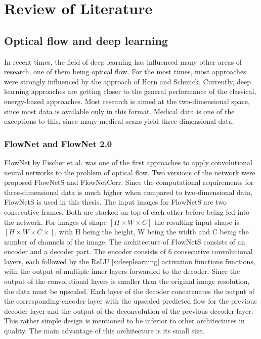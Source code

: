 \chapter{Review of Literature}

\section{Optical flow and deep learning}
In recent times, the field of deep learning has influenced many other areas of research, one of them being optical flow. For the most times, most approaches were strongly influenced by the approach of Horn and Schunck\cite{hornDeterminingOpticalFlow}. 
Currently, deep learning approaches are getting closer to the general performance of the classical, energy-based approaches. 
Most research is aimed at the two-dimensional space, since most data is available only in this format. Medical data is one of the exceptions to this, since many medical scans yield three-dimensional data.
\subsection{FlowNet and FlowNet 2.0}
FlowNet by Fischer et al. \cite{fischerFlowNetLearningOptical2015} was one of the first approaches to apply convolutional neural networks  to the problem of optical flow. 
Two versions of the network were proposed \ac{FlowNetS} and FlowNetCorr. 
Since the computational requirements for three-dimensional data is much higher when compared to two-dimensional data, \acs{FlowNetS} is used in this thesis.
The input images for \acs{FlowNetS} are two consecutive frames. Both are stacked on top of each other before being fed into the network. For images of shape $\left[H\times W \times C\right]$ the resulting input shape is $\left[H \times W \times C \times \right]$, with H being the height, W being the width and C being the number of channels of the image.
The architecture of FlowNetS consists of an encoder and a decoder part.
The encoder consists  of 6 consecutive convolutional layers, each followed by the ReLU  \eqref{s:deeplearning} activation functions functions, with the output of multiple inner layers forwarded to the decoder.
Since the output of the convolutional layers is smaller than the original image resolution, the data must be upscaled. Each layer of the decoder concatenates the output of the corresponding encoder layer with the upscaled predicted flow for the previous decoder layer and the output of the deconvolution of the previous decoder layer. This rather simple design is mentioned to be inferior to other architectures in quality. The main advantage of this architecture is its small size.

